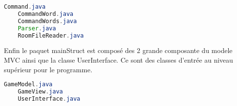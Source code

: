 \documentclass[a4paper , 10pt]{article}
\begin{document}
\begin{lstlisting}[language=Java, caption={pkg\_tools}]
    Command.java  
    CommandWord.java  
    CommandWords.java  
    Parser.java  
    RoomFileReader.java
\end{lstlisting}

Enfin le paquet mainStruct est composé des 2 grande composante du modele MVC ainsi que la classe UserInterface.
Ce sont des classes d'entrée au niveau supérieur pour le programme.
\begin{lstlisting}[language=Java, caption={pkg\_commands}]
    GameModel.java  
    GameView.java  
    UserInterface.java
\end{lstlisting}
\end{document}
